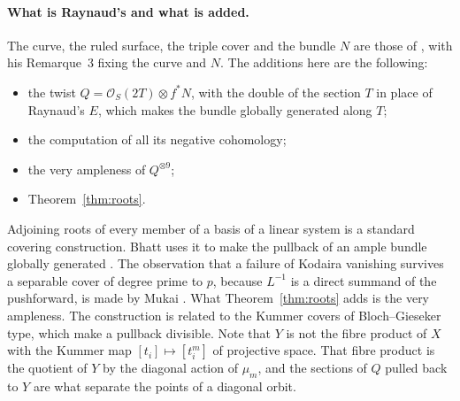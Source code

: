 \documentclass[11pt,a4paper]{article}
\theoremstyle{plain}
\theoremstyle{remark}
\newcommand{\OO}{\mathcal O}
\begin{document}
\paragraph{What is Raynaud's and what is added.} The curve, the ruled surface, the triple cover and the bundle $N$ are
those of \cite[\S\S1--3]{Raynaud}, with his Remarque~3 fixing the curve and $N$. The additions here are the following:
\begin{itemize}
\item the twist $Q=\OO_S(2T)\otimes f^*N$, with the double of the section $T$ in place of Raynaud's $E$, which makes the
bundle globally generated along $T$;
\item the computation of all its negative cohomology;
\item the very ampleness of $Q^{\otimes 9}$;
\item Theorem~\ref{thm:roots}.
\end{itemize}
Adjoining roots of every member of a basis of a linear system is a standard covering construction. Bhatt uses it to
make the pullback of an ample bundle globally generated \cite[proof of Proposition~7.2, p.~1771]{Bhatt}. The observation
that a failure of Kodaira vanishing survives a separable cover of degree prime to $p$, because $L^{-1}$ is a direct
summand of the pushforward, is made by Mukai \cite[p.~2]{Mukai}. What Theorem~\ref{thm:roots} adds is the very
ampleness. The construction is related to the Kummer covers of Bloch--Gieseker type, which make a pullback divisible.
Note that $Y$ is not the fibre product of $X$ with the Kummer map $[t_i]\mapsto[t_i^m]$ of projective space. That fibre
product is the quotient of $Y$ by the diagonal action of $\mu_m$, and the sections of $Q$ pulled back to $Y$ are what
separate the points of a diagonal orbit.
\end{document}
